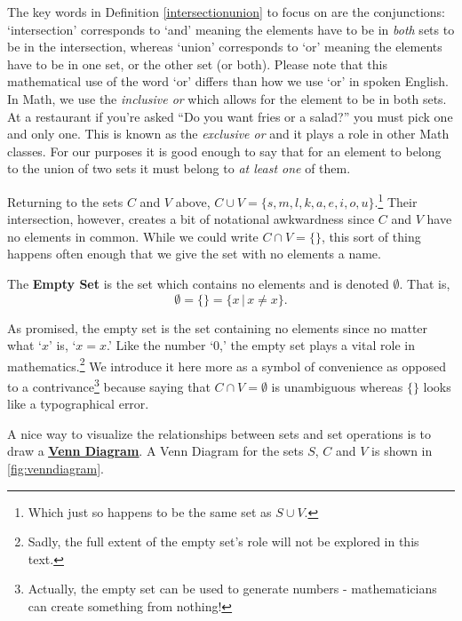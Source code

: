The key words in Definition \ref{intersectionunion} to focus on are the conjunctions:  `intersection' corresponds to `and' meaning the elements have to be in \textit{both} sets to be in the intersection, whereas `union' corresponds to `or' meaning the elements have to be in one set, or the other set (or both).  Please note that this mathematical use of the word `or' differs than how we use `or' in spoken English.  In Math, we use the \emph{inclusive or} which allows for the element to be in both sets.  At a restaurant if you're asked ``Do you want fries or a salad?'' you must pick one and only one.  This is known as the \emph{exclusive or} and it plays a role in other Math classes.  For our purposes it is good enough to say that for an element to belong to the union of two sets it must belong to \textit{at least one} of them.

Returning to the sets $C$ and $V$  above, $C \cup V = \{ s, m, l, k, a, e, i, o, u\}$.\footnote{Which just so happens to be the same set as $S \cup V$.}  Their intersection, however, creates a bit of notational awkwardness since $C$ and $V$ have no elements in common.  While we could write $C \cap V = \{ \}$, this sort of thing happens often enough that we give the set with no elements a name. 

\begin{tcolorbox}
\begin{defn} \label{emptysetdefn}

The \textbf{Empty Set} is the set which contains no elements and is denoted $\emptyset$.  That is, \[\emptyset=\{ \}=\{x\,|\,\mbox{$x \neq x$}\}.\]  

\end{defn}
\end{tcolorbox}

As promised, the empty set is the set containing no elements since no matter what `$x$' is, `$x = x$.'  Like the number `$0$,'  the empty set plays a vital role in mathematics.\footnote{Sadly, the full extent of the empty set's role will not be explored in this text.} We introduce it here more as a symbol of convenience as opposed to a contrivance\footnote{Actually, the empty set can be used to generate numbers -  mathematicians can create something from nothing!} because saying that $C \cap V = \emptyset$ is unambiguous whereas $\{ \}$ looks like a typographical error.    

A nice way to visualize the relationships between sets and set operations is to draw a  \href{http://en.wikipedia.org/wiki/Venn_diagram}{\underline{\textbf{Venn Diagram}}}.  A Venn Diagram for the sets $S$, $C$ and $V$ is shown in \autoref{fig:venndiagram}.

